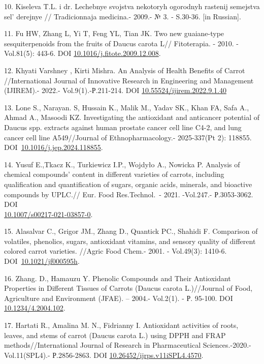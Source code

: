 \begin{refs}
10. Kiseleva T.L. i dr. Lechebnye svojstva nekotoryh ogorodnyh rastenij
semejstva sel' derejnye // Tradi\-cionnaja medicina.- 2009.-
№ 3. - S.30-36. {[}in Russian{]}.

11. Fu HW, Zhang L, Yi T, Feng YL, Tian JK. Two new guaiane-type
sesquiterpenoids from the fruits of Daucus carota L// Fitoterapia. -
2010. -Vol.81(5): 443-6.
DOI \href{https://doi.org/10.1016/j.fitote.2009.12.008}{10.1016/j.fitote.2009.12.008}.

12. Khyati Varshney , Kirti Mishra. An Analysis of Health Benefits of
Carrot //International Journal of Innovative Research in Engineering and
Management (IJIREM).- 2022.- Vol.9(1).-Р.211-214. DOI
\href{http://dx.doi.org/10.55524/ijirem.2022.9.1.40}{10.55524/ijirem.2022.9.1.40}

13. Lone S., Narayan. S, Hussain K., Malik M., Yadav SK., Khan FA, Safa
A., Ahmad A., Masoodi KZ. Investigating the antioxidant and anticancer
potential of Daucus spp. extracts against human prostate cancer cell
line C4-2, and lung cancer cell line A549//Journal of
Ethnopharmacology.- 2025-337(Pt 2): 118855.
DOI~\href{https://doi.org/10.1016/j.jep.2024.118855}{10.1016/j.jep.2024.118855}.

14. Yusuf E.,Tkacz K., Turkiewicz I.P., Wojdyło A., Nowicka P. Analysis
of chemical compounds' content in different varieties of carrots,
including qualification and quantification of sugars, organic acids,
minerals, and bioactive compounds by UPLC.// Eur. Food Res.Technol.~-
2021. -Vol.247.- Р.3053-3062. DOI\\
\href{https://link.springer.com/article/10.1007\%2Fs00217-021-03857-0}{10.1007/s00217-021-03857-0}.

15. Alasalvar C., Grigor JM., Zhang D., Quantick PC., Shahidi F.
Comparison of volatiles, phenolics, sugars, antioxidant vitamins, and
sensory quality of different colored carrot varieties. //Agric Food
Chem.- 2001. - Vol.49(3): 1410-6.
DOI~\href{https://doi.org/10.1021/jf000595h}{10.1021/jf000595h}.

16. Zhang. D., Hamauzu Y. Phenolic Compounds and Their Antioxidant
Properties in Different Tissues of Carrots (Daucus carota L.)//Journal
of Food, Agriculture and Environment (JFAE). -- 2004.- Vol.2(1). - Р.
95-100. DOI~ \href{javascript:void()}{10.1234/4.2004.102}.

17. Hartati R., Amalina M. N., Fidrianny I. Antioxidant activities of
roots, leaves, and stems of carrot (Daucus carota L.) using DPPH and
FRAP methods//International Journal of Research in Pharmaceutical
Sciences.-2020.-Vol.11(SPL4).- Р.2856-2863. DOI
\href{http://dx.doi.org/10.26452/ijrps.v11iSPL4.4570}{10.26452/ijrps.v11iSPL4.4570}.


\end{refs}
